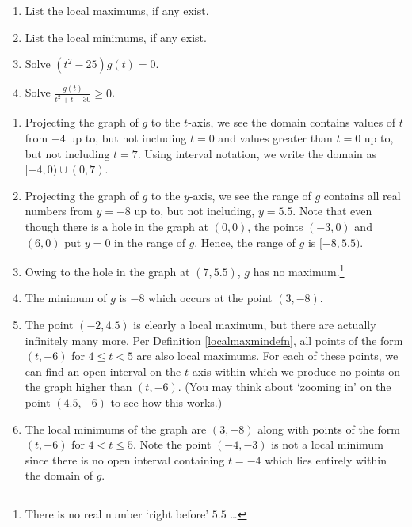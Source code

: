 \documentclass{ximera}
\begin{document}
\begin{example}
\begin{enumerate}
\item  List the local maximums, if any exist.

\item  List the local minimums, if any exist.


\item  Solve $(t^2-25) g(t) = 0$. 

\item  Solve $\frac{g(t)}{t^2+t-30} \geq 0$.

\end{enumerate}

\begin{explanation}

\begin{enumerate}

\item  Projecting the graph of $g$ to the $t$-axis, we see the domain contains values of $t$ from $-4$ up to, but not including $t=0$ and values greater than $t=0$ up to, but not including $t=7$.   Using interval notation, we write the domain as $[-4, 0) \cup (0,7)$.

\item  Projecting the graph of $g$ to the $y$-axis, we see the range of $g$ contains all real numbers from $y=-8$ up to, but not including, $y = 5.5$.  Note that even though there is a hole in the graph at $(0,0)$, the points $(-3,0)$ and $(6,0)$ put $y=0$ in the range of $g$.  Hence, the range of $g$ is $[-8, 5.5)$.

\item  Owing to the hole in the graph at $(7, 5.5)$, $g$ has no maximum.\footnote{There is no real number `right before' $5.5$ \ldots}

\item  The minimum of $g$ is $-8$ which occurs at the point $(3,-8)$.

\item  The point $(-2, 4.5)$ is clearly a local maximum, but there are actually infinitely many more.  Per Definition \ref{localmaxmindefn}, all points of the form $(t, -6)$ for $4 \leq t < 5$ are also local maximums.  For each of these points, we can find an open interval on the $t$ axis within which we produce no points on the graph higher than $(t,-6)$.  (You may think about `zooming in' on the point $(4.5, -6)$ to see how this works.)

\item  The local minimums of the graph are $(3,-8)$ along with points of the form $(t,-6)$ for $4< t \leq 5$.  Note the point $(-4,-3)$ is not a local minimum since there is no open interval containing $t=-4$ which lies entirely within the domain of $g$.


\end{enumerate}
\end{explanation}
\end{example}
\end{document}
